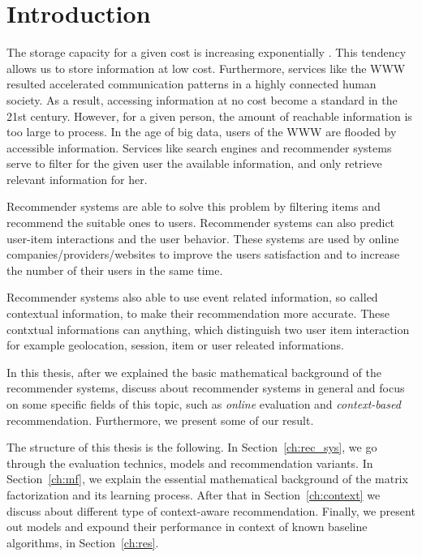 \chapter{Introduction}
The storage capacity for a given cost is increasing exponentially \cite{wiki:krydr}.
This tendency allows us to store information at low cost. Furthermore, services like the WWW
resulted accelerated communication patterns in a highly connected human society. As a
result, accessing information at no cost become a standard in the 21st century. However,
for a given person, the amount of reachable information is too large to process. In the age of big
data, users of the WWW are flooded by accessible information. Services like search engines
and recommender systems serve to filter for the given user the available information, and
only retrieve relevant information for her. 

Recommender systems are able to solve this problem by filtering items and recommend the 
suitable ones to users. Recommender systems can  also predict user-item interactions and
the  user behavior. These systems are used by online companies/providers/websites to improve
the users satisfaction and to increase the number of their users in the same time. 

Recommender systems also able to use event related information, so called contextual information,
to make their recommendation more accurate. These contxtual informations can anything, which 
distinguish two user item interaction for example geolocation, session, item or user releated informations.

In this thesis, after we explained the basic mathematical background of the recommender systems,
discuss about recommender systems in general and focus on some specific fields of this topic, such as \emph{online} evaluation and \emph{context-based} recommendation. Furthermore, we present some of our result.

The structure of this thesis is the following. In Section~\ref{ch:rec_sys}, we go through the 
evaluation technics, models  and recommendation variants. In Section~\ref{ch:mf}, we explain the 
essential mathematical background of the matrix factorization and its learning process. After that
in Section~\ref{ch:context} we discuss about different type of context-aware recommendation. Finally,
we present out models and expound their performance in context of known baseline algorithms, in 
Section~\ref{ch:res}.